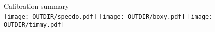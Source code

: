 \documentclass{article}
\begin{document}
\thispagestyle{empty}

\begin{center}
\Large{Calibration summary}\\

\texttt{[image: OUTDIR/speedo.pdf]}
\texttt{[image: OUTDIR/boxy.pdf]}
\texttt{[image: OUTDIR/timmy.pdf]}
\end{center}
\end{document}
